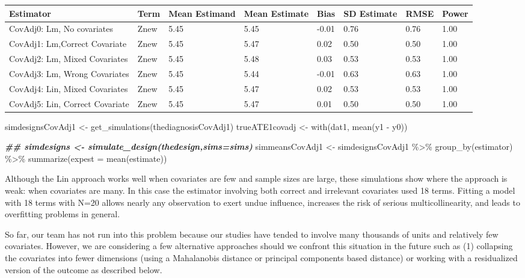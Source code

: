 \documentclass[
  12pt,
]{book}
\newenvironment{Shaded}{\begin{snugshade}}{\end{snugshade}}
\newcommand{\AttributeTok}[1]{\textcolor[rgb]{0.77,0.63,0.00}{#1}}
\newcommand{\DocumentationTok}[1]{\textcolor[rgb]{0.56,0.35,0.01}{\textbf{\textit{#1}}}}
\newcommand{\FunctionTok}[1]{\textcolor[rgb]{0.00,0.00,0.00}{#1}}
\newcommand{\NormalTok}[1]{#1}
\newcommand{\OtherTok}[1]{\textcolor[rgb]{0.56,0.35,0.01}{#1}}
\newcommand{\SpecialCharTok}[1]{\textcolor[rgb]{0.00,0.00,0.00}{#1}}
\theoremstyle{definition}
\theoremstyle{definition}
\theoremstyle{definition}
\theoremstyle{remark}
\begin{document}
\begin{tabular}{l|l|l|l|l|l|l|l}
\hline
Estimator & Term & Mean Estimand & Mean Estimate & Bias & SD Estimate & RMSE & Power\\
\hline
CovAdj0: Lm, No covariates & Znew & 5.45 & 5.45 & -0.01 & 0.76 & 0.76 & 1.00\\
\hline
CovAdj1: Lm,Correct Covariate & Znew & 5.45 & 5.47 & 0.02 & 0.50 & 0.50 & 1.00\\
\hline
CovAdj2: Lm,  Mixed Covariates & Znew & 5.45 & 5.48 & 0.03 & 0.53 & 0.53 & 1.00\\
\hline
CovAdj3: Lm, Wrong Covariates & Znew & 5.45 & 5.44 & -0.01 & 0.63 & 0.63 & 1.00\\
\hline
CovAdj4: Lin, Mixed Covariates & Znew & 5.45 & 5.47 & 0.02 & 0.53 & 0.53 & 1.00\\
\hline
CovAdj5: Lin, Correct Covariate & Znew & 5.45 & 5.47 & 0.01 & 0.50 & 0.50 & 1.00\\
\hline
\end{tabular}

\begin{Shaded}
\begin{Highlighting}[]
\NormalTok{simdesignsCovAdj1 }\OtherTok{\textless{}{-}} \FunctionTok{get\_simulations}\NormalTok{(thediagnosisCovAdj1)}
\NormalTok{trueATE1covadj }\OtherTok{\textless{}{-}} \FunctionTok{with}\NormalTok{(dat1, }\FunctionTok{mean}\NormalTok{(y1 }\SpecialCharTok{{-}}\NormalTok{ y0))}

\DocumentationTok{\#\# simdesigns \textless{}{-} simulate\_design(thedesign,sims=sims)}
\NormalTok{simmeansCovAdj1 }\OtherTok{\textless{}{-}}\NormalTok{ simdesignsCovAdj1 }\SpecialCharTok{\%\textgreater{}\%}
  \FunctionTok{group\_by}\NormalTok{(estimator) }\SpecialCharTok{\%\textgreater{}\%}
  \FunctionTok{summarize}\NormalTok{(}\AttributeTok{expest =} \FunctionTok{mean}\NormalTok{(estimate))}
\end{Highlighting}
\end{Shaded}

Although the Lin approach works well when covariates are few and sample
sizes are large, these simulations show where the approach is weak: when
covariates are many. In this case the estimator involving both correct
and irrelevant covariates used 18 terms. Fitting a model with 18 terms
with N=20 allows nearly any observation to exert undue influence,
increases the risk of serious multicollinearity, and leads to
overfitting problems in general.

So far, our team has not run into this problem because our studies have
tended to involve many thousands of units and relatively few covariates.
However, we are considering a few alternative approaches should we
confront this situation in the future such as (1) collapsing the
covariates into fewer dimensions (using a Mahalanobis distance or
principal components based distance) or working with a residualized
version of the outcome as described below.
\end{document}
